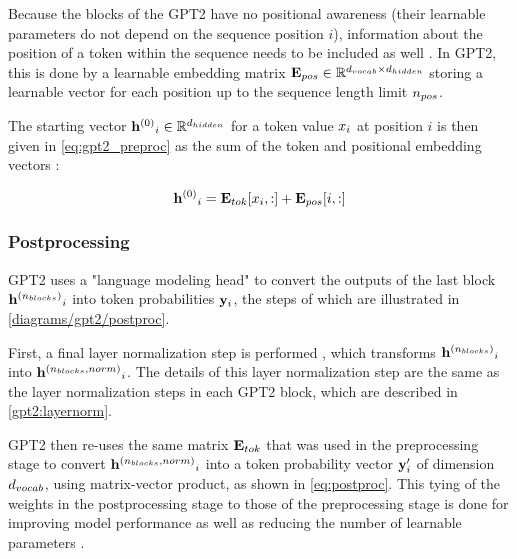 Because the blocks of the GPT2 have no positional awareness (their learnable parameters do not depend on the sequence position $i$), information about the position of a token within the sequence needs to be included as well .
In GPT2, this is done by a learnable embedding matrix ${\mathbf{E}_{pos}} \in \mathbb{R}^{{d_{vocab}} \times {d_{hidden}}}$ storing a learnable vector for each position up to the sequence length limit ${n_{pos}}$.

The starting vector ${\mathbf{h}^{(0)}}_i \in \mathbb{R}^{d_{hidden}}$ for a token value ${x}_i$ at position $i$ is then given in \cref{eq:gpt2_preproc} as the sum of the token and positional embedding vectors :

\begin{equation}
	{\mathbf{h}^{(0)}}_i = {{\mathbf{E}_{tok}}[x_i, :]} + {{\mathbf{E}_{pos}}[i, :]}
	\label{eq:gpt2_preproc}
\end{equation}



\subsubsection{Postprocessing}
\label{gpt2:postproc}

GPT2 uses a "language modeling head" \cite{HuggingFaceGPT2} to convert the outputs of the last block ${\mathbf{h}^{({n_{blocks}})}}_i$ into token probabilities ${\mathbf{y}}_i$, the steps of which are illustrated in \cref{diagrams/gpt2/postproc}.

First, a final layer normalization step is performed , which transforms ${\mathbf{h}^{({n_{blocks}})}}_i$ into ${\mathbf{h}^{({n_{blocks}}, norm)}}_i$. The details of this layer normalization step are  the same as the layer normalization steps in each GPT2 block, which are described in \cref{gpt2:layernorm}.

GPT2 then re-uses the same matrix ${\mathbf{E}_{tok}}$ that was used in the preprocessing stage to convert ${\mathbf{h}^{({n_{blocks}}, norm)}}_i$ into a token probability vector ${\mathbf{y}}'_i$ of dimension ${d_{vocab}}$, using matrix-vector product, as shown in \cref{eq:postproc}.
This tying of the weights in the postprocessing stage to those of the preprocessing stage is done for improving model performance as well as reducing the number of learnable parameters \cite{weightstying}.

